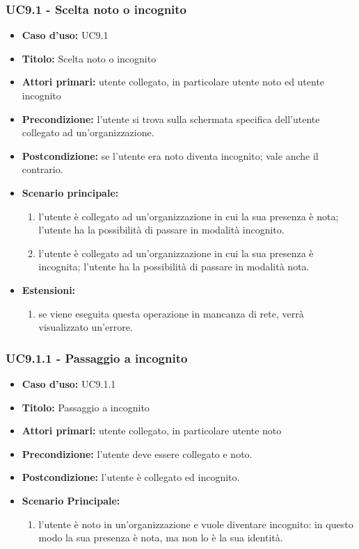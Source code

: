 \documentclass[casi-duso]{subfiles}
\begin{document}
\subsubsection{UC9.1 - Scelta noto o incognito}
\label{subsub:uc9.1utente}
\begin{itemize}
  \item \textbf{Caso d’uso:} UC9.1
  \item \textbf{Titolo:} Scelta noto o incognito
  \item \textbf{Attori primari:} utente collegato, in particolare utente noto ed utente incognito
  \item \textbf{Precondizione:} l'utente si trova sulla schermata specifica dell'utente collegato ad un'organizzazione.
  \item \textbf{Postcondizione:} se l'utente era noto diventa incognito; vale anche il contrario.
  \item \textbf{Scenario principale:} 
  \begin{enumerate}
    \item l'utente è collegato ad un'organizzazione in cui la sua presenza è nota; l'utente ha la possibilità di passare in modalità incognito.
    \item l'utente è collegato ad un'organizzazione in cui la sua presenza è incognita; l'utente ha la possibilità di passare in modalità nota.
  \end{enumerate}
  \item \textbf{Estensioni:} 
  \begin{enumerate}
    \item se viene eseguita questa operazione in mancanza di rete, verrà visualizzato un'errore. 
  \end{enumerate}  
\end{itemize}

\subsubsection{UC9.1.1 - Passaggio a incognito}
\label{subsub:uc9.1.1utente}
\begin{itemize}
  \item \textbf{Caso d’uso:} UC9.1.1
  \item \textbf{Titolo:} Passaggio a incognito
  \item \textbf{Attori primari:} utente collegato, in particolare utente noto
  \item \textbf{Precondizione:} l'utente deve essere collegato e noto.
  \item \textbf{Postcondizione:} l'utente è collegato ed incognito.
  \item \textbf{Scenario Principale:}
  \begin{enumerate}
    \item l'utente è noto in un'organizzazione e vuole diventare incognito: in questo modo la sua presenza è nota, ma non lo è la sua identità.
  \end{enumerate}
\end{itemize}
\end{document}
